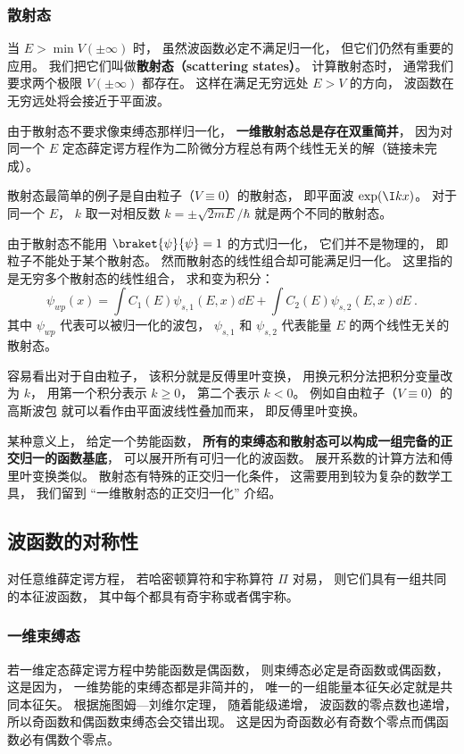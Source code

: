 \subsubsection{散射态}
当 $E > \min V(\pm\infty)$ 时， 虽然波函数必定不满足归一化， 但它们仍然有重要的应用。 我们把它们叫做\textbf{散射态（scattering states）}。 计算散射态时， 通常我们要求两个极限 $V(\pm \infty)$ 都存在。 这样在满足无穷远处 $E > V$ 的方向， 波函数在无穷远处将会接近于平面波。

由于散射态不要求像束缚态那样归一化， \textbf{一维散射态总是存在双重简并}， 因为对同一个 $E$ 定态薛定谔方程作为二阶微分方程总有两个线性无关的解（链接未完成）。

散射态最简单的例子是自由粒子（$V\equiv 0$）的散射态， 即平面波 $\exp(\I kx)$。 对于同一个 $E$， $k$ 取一对相反数 $k = \pm\sqrt{2mE}/\hbar$ 就是两个不同的散射态。

由于散射态不能用 $\braket{\psi}{\psi} = 1$ 的方式归一化， 它们并不是物理的， 即粒子不能处于某个散射态。 然而散射态的线性组合却可能满足归一化。 这里指的是无穷多个散射态的线性组合， 求和变为积分：
\begin{equation}
\psi_{wp}(x) = \int C_1(E) \psi_{s,1}(E, x)\dd{E} + \int C_2(E) \psi_{s,2}(E, x)\dd{E}~.
\end{equation}
其中 $\psi_{wp}$ 代表可以被归一化的波包， $\psi_{s,1}$ 和 $\psi_{s,2}$ 代表能量 $E$ 的两个线性无关的散射态。

容易看出对于自由粒子， 该积分就是反傅里叶变换， 用换元积分法把积分变量改为 $k$， 用第一个积分表示 $k\ge 0$， 第二个表示 $k<0$。 例如自由粒子（$V \equiv 0$）的高斯波包 就可以看作由平面波线性叠加而来， 即反傅里叶变换。

某种意义上， 给定一个势能函数， \textbf{所有的束缚态和散射态可以构成一组完备的正交归一的函数基底}， 可以展开所有可归一化的波函数。 展开系数的计算方法和傅里叶变换类似。 散射态有特殊的正交归一化条件， 这需要用到较为复杂的数学工具， 我们留到 “一维散射态的正交归一化” 介绍。

\subsection{波函数的对称性}
对任意维薛定谔方程， 若哈密顿算符和宇称算符 $\Pi$ 对易， 则它们具有一组共同的本征波函数， 其中每个都具有奇宇称或者偶宇称。

\subsubsection{一维束缚态}
若一维定态薛定谔方程中势能函数是偶函数， 则束缚态必定是奇函数或偶函数， 这是因为， 一维势能的束缚态都是非简并的， 唯一的一组能量本征矢必定就是共同本征矢。 根据施图姆—刘维尔定理， 随着能级递增， 波函数的零点数也递增， 所以奇函数和偶函数束缚态会交错出现。 这是因为奇函数必有奇数个零点而偶函数必有偶数个零点。

